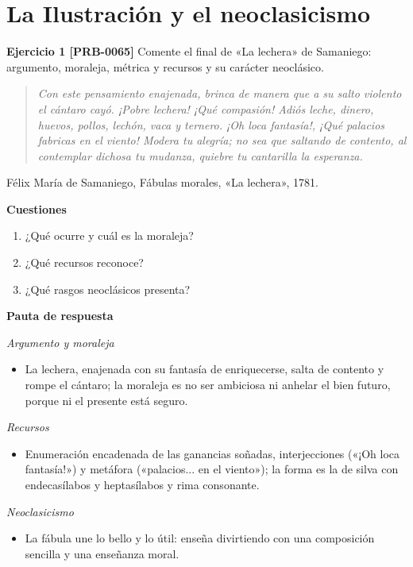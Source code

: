 \documentclass{book}
\begin{document}
\section{La Ilustración y el neoclasicismo}

\noindent\textbf{Ejercicio 1 [PRB-0065]}
Comente el final de «La lechera» de Samaniego: argumento, moraleja, métrica y recursos y su carácter neoclásico.


\begin{quote}
\itshape Con este pensamiento enajenada, brinca de manera que a su salto violento el cántaro cayó. ¡Pobre lechera! ¡Qué compasión! Adiós leche, dinero, huevos, pollos, lechón, vaca y ternero. ¡Oh loca fantasía!, ¡Qué palacios fabricas en el viento! Modera tu alegría; no sea que saltando de contento, al contemplar dichosa tu mudanza, quiebre tu cantarilla la esperanza.
\end{quote}
{\noindent\footnotesize Félix María de Samaniego, Fábulas morales, «La lechera», 1781.\par}

\noindent\textbf{Cuestiones}
\begin{enumerate}
\item ¿Qué ocurre y cuál es la moraleja?
\item ¿Qué recursos reconoce?
\item ¿Qué rasgos neoclásicos presenta?
\end{enumerate}

\noindent\textbf{Pauta de respuesta}

\noindent\textit{Argumento y moraleja}
\begin{itemize}
\item La lechera, enajenada con su fantasía de enriquecerse, salta de contento y rompe el cántaro; la moraleja es no ser ambiciosa ni anhelar el bien futuro, porque ni el presente está seguro.
\end{itemize}

\noindent\textit{Recursos}
\begin{itemize}
\item Enumeración encadenada de las ganancias soñadas, interjecciones («¡Oh loca fantasía!») y metáfora («palacios... en el viento»); la forma es la de silva con endecasílabos y heptasílabos y rima consonante.
\end{itemize}

\noindent\textit{Neoclasicismo}
\begin{itemize}
\item La fábula une lo bello y lo útil: enseña divirtiendo con una composición sencilla y una enseñanza moral.
\end{itemize}
\end{document}
